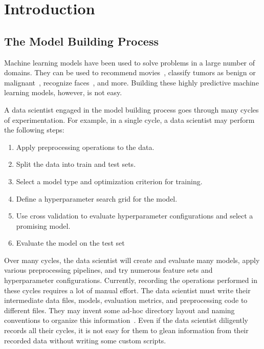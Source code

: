 \chapter{Introduction}
\section{The Model Building Process}
Machine learning models have been used to solve problems in a large number of
domains. They can be used to recommend movies~\cite{netflixprize}, 
classify tumors as benign or malignant~\cite{tumorprediction}, recognize faces~\cite{deepface}, and more. 
Building these highly predictive machine learning models, however, is not easy. 

A data scientist engaged in the model building process goes through many cycles of
experimentation. For example, in a single cycle, a data scientist may perform the
following steps:

\begin{enumerate}
  \item Apply preprocessing operations to the data.
  \item Split the data into train and test sets.
  \item Select a model type and optimization criterion for training.
  \item Define a hyperparameter search grid for the model.
  \item Use cross validation to evaluate hyperparameter configurations and select a 
    promising model.
  \item Evaluate the model on the test set
\end{enumerate}

Over many cycles, the data scientist will create and evaluate many models,
apply various preprocessing pipelines, and try numerous feature sets and hyperparameter
configurations. Currently, recording the operations performed in these cycles requires
a lot of manual effort. The data scientist must write their intermediate data files, models, evaluation metrics,
and preprocessing code to different files. They may invent some ad-hoc directory layout 
and naming conventions to organize this information~\cite{kaggledirectory}. Even if the data scientist
diligently records all their cycles, it is not easy for them to glean information from their
recorded data without writing some custom scripts.


